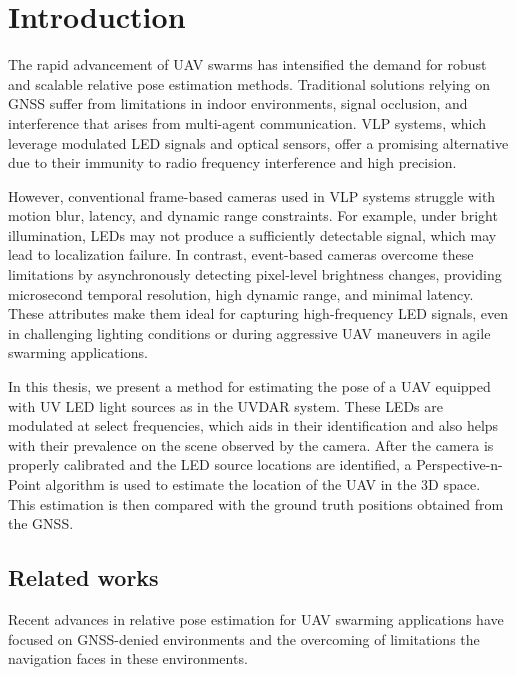 
\chapter{Introduction\label{chap:introduction}}

The rapid advancement of \ac{UAV} swarms has intensified the demand for robust and scalable relative pose estimation methods.
Traditional solutions relying on \ac{GNSS} suffer from limitations in indoor environments, signal occlusion, and interference that arises from
multi-agent communication.
\ac{VLP} systems, which leverage modulated \ac{LED} signals and optical sensors, offer a promising alternative due to their immunity to radio
frequency interference and high precision.

However, conventional frame-based cameras used in \ac{VLP} systems struggle with motion blur, latency,
and dynamic range constraints. For example, under bright illumination, \ac{LED}s may not produce a sufficiently detectable signal,
which may lead to localization failure. In contrast, event-based cameras overcome these limitations by asynchronously detecting pixel-level
brightness changes, providing microsecond temporal resolution, high dynamic range, and minimal latency. These attributes make them ideal for
capturing high-frequency LED signals, even in challenging lighting conditions or during aggressive \ac{UAV} maneuvers in agile swarming applications.

In this thesis, we present a method for estimating the pose of a \ac{UAV} equipped with \ac{UV} \ac{LED} light sources as in the UVDAR system. \cite{walteruvdar}
These \ac{LED}s are modulated at select frequencies, which aids in their identification and also helps with their prevalence
on the scene observed by the camera. After the camera is properly calibrated and the LED source locations are identified, a Perspective-n-Point 
algorithm is used to estimate the location of the \ac{UAV} in the 3D space. This estimation is then compared with the ground truth positions obtained
from the \ac{GNSS}.

\section{Related works}
Recent advances in relative pose estimation for UAV swarming applications
have focused on GNSS-denied environments and the overcoming of limitations
the navigation faces in these environments.

